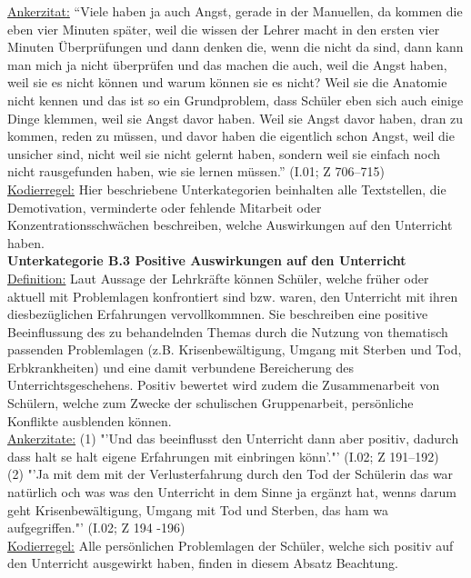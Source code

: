 \underline{Ankerzitat:} "`Viele haben ja auch Angst, gerade in der Manuellen, da kommen die eben vier Minuten später, weil die wissen der Lehrer macht in den ersten vier Minuten Überprüfungen und dann denken die, wenn die nicht da sind, dann kann man mich ja nicht überprüfen und das machen die auch, weil die Angst haben, weil sie es nicht können und warum können sie es nicht? Weil sie die Anatomie nicht kennen und das ist so ein Grundproblem, dass Schüler eben sich auch einige Dinge klemmen, weil sie Angst davor haben. Weil sie Angst davor haben, dran zu kommen, reden zu müssen, und davor haben die eigentlich schon Angst, weil die unsicher sind, nicht weil sie nicht gelernt haben, sondern weil sie einfach noch nicht rausgefunden haben, wie sie lernen müssen."' (I.01; Z 706--715)\\
\underline{Kodierregel:} Hier beschriebene Unterkategorien beinhalten alle Textstellen, die Demotivation, verminderte oder fehlende Mitarbeit oder Konzentrationsschwächen beschreiben, welche Auswirkungen auf den Unterricht haben.\\

\textbf{Unterkategorie B.3 Positive Auswirkungen auf den Unterricht}\\
\underline{Definition:} Laut Aussage der Lehrkräfte können Schüler, welche früher oder aktuell mit Problemlagen konfrontiert sind bzw. waren, den Unterricht mit ihren diesbezüglichen Erfahrungen vervollkommnen. Sie beschreiben eine positive Beeinflussung des zu behandelnden Themas durch die Nutzung von thematisch passenden Problemlagen (z.B. Krisenbewältigung, Umgang mit Sterben und Tod, Erbkrankheiten) und eine damit verbundene Bereicherung des Unterrichtsgeschehens. Positiv bewertet wird zudem die Zusammenarbeit von Schülern, welche zum Zwecke der schulischen Gruppenarbeit, persönliche Konflikte ausblenden können.\\
\underline{Ankerzitate:} (1) "'Und das beeinflusst den Unterricht dann aber positiv, dadurch dass halt se halt eigene Erfahrungen mit einbringen könn'."' (I.02; Z 191--192)\\ (2) "'Ja mit dem mit der Verlusterfahrung durch den Tod der Schülerin das war natürlich och was was den Unterricht in dem Sinne ja ergänzt hat, wenns darum geht Krisenbewältigung, Umgang mit Tod und Sterben, das ham wa aufgegriffen."' (I.02; Z 194 -196)\\
\underline{Kodierregel:} Alle persönlichen Problemlagen der Schüler, welche sich positiv auf den Unterricht ausgewirkt haben, finden in diesem Absatz Beachtung.\\

